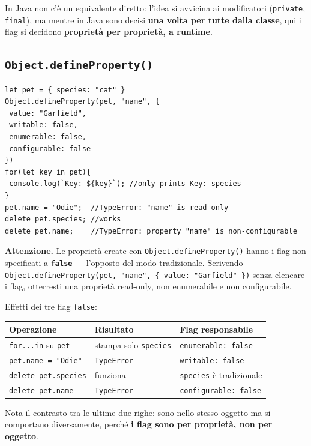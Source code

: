 \documentclass[10pt,a4paper]{article}
\newcommand{\avviso}[1]{\textbf{\textcolor{wamber}{Attenzione.}} #1}
\begin{document}
In Java non c'è un equivalente diretto: l'idea si avvicina ai modificatori (\texttt{private}, \texttt{final}), ma mentre in Java sono decisi \textbf{una volta per tutte dalla classe}, qui i flag si decidono \textbf{proprietà per proprietà, a runtime}.

\subsection{\texttt{Object.defineProperty()}}

\begin{lstlisting}[style=js]
let pet = { species: "cat" }
Object.defineProperty(pet, "name", {
 value: "Garfield",
 writable: false,
 enumerable: false,
 configurable: false
})
for(let key in pet){
 console.log(`Key: ${key}`); //only prints Key: species
}
pet.name = "Odie";  //TypeError: "name" is read-only
delete pet.species; //works
delete pet.name;    //TypeError: property "name" is non-configurable
\end{lstlisting}

\begin{warnbox}
\avviso{Le proprietà create con \texttt{Object.defineProperty()} hanno i flag non specificati a \textbf{\texttt{false}} --- l'opposto del modo tradizionale. Scrivendo \texttt{Object.defineProperty(pet, "name", \{ value: "Garfield" \})} senza elencare i flag, otterresti una proprietà read-only, non enumerabile e non configurabile.}
\end{warnbox}

Effetti dei tre flag \texttt{false}:

\begin{center}
\small
\begin{tabularx}{\textwidth}{@{}lXX@{}}
\toprule
\textbf{Operazione} & \textbf{Risultato} & \textbf{Flag responsabile} \\
\midrule
\texttt{for...in} su \texttt{pet} & stampa solo \texttt{species} & \texttt{enumerable: false} \\
\texttt{pet.name = "Odie"} & \texttt{TypeError} & \texttt{writable: false} \\
\texttt{delete pet.species} & funziona & \texttt{species} è tradizionale \\
\texttt{delete pet.name} & \texttt{TypeError} & \texttt{configurable: false} \\
\bottomrule
\end{tabularx}
\end{center}

Nota il contrasto tra le ultime due righe: sono nello stesso oggetto ma si comportano diversamente, perché \textbf{i flag sono per proprietà, non per oggetto}.
\end{document}
